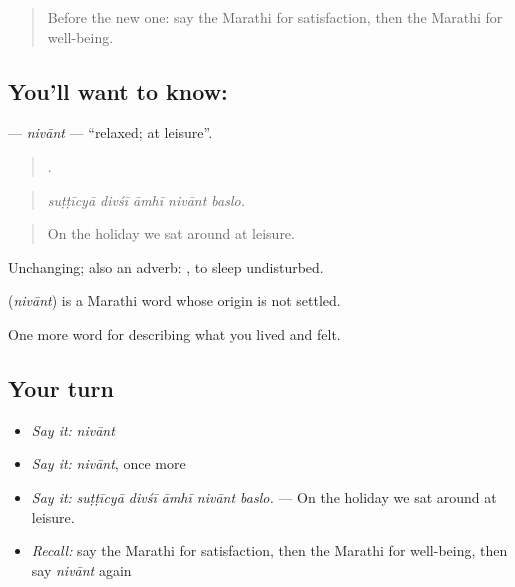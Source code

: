 \label{lesson:MR-C466-nivant}



\begin{quote}
Before the new one: say the Marathi for satisfaction, then the Marathi for well-being.
\end{quote}

\subsection*{You'll want to know: }
\textbf{} — \emph{nivānt} — \textquotedblleft{}relaxed; at leisure\textquotedblright{}.

\begin{quote}
    .
\end{quote}

\begin{quote}
\emph{suṭṭīcyā divśī āmhī nivānt baslo.}
\end{quote}

\begin{quote}
On the holiday we sat around at leisure.
\end{quote}

Unchanging; also an adverb:  , to sleep undisturbed.

\begin{cousinweb}
\textbf{} (\emph{nivānt}) is a Marathi word whose origin is not settled.
\end{cousinweb}

\begin{grammarlens}[title={What you've built}]
One more word for describing what you lived and felt.
\end{grammarlens}

\subsection*{Your turn}
\begin{itemize}
\raggedright
  \item \emph{Say it:} \emph{nivānt}
  \item \emph{Say it:} \emph{nivānt}, once more
  \item \emph{Say it:} \emph{suṭṭīcyā divśī āmhī nivānt baslo.} — On the holiday we sat around at leisure.
  \item \emph{Recall:} say the Marathi for satisfaction, then the Marathi for well-being, then say \emph{nivānt} again
\end{itemize}

